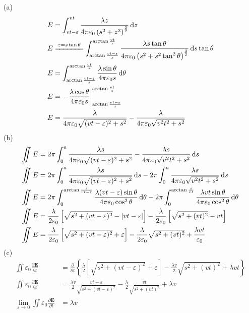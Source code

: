 (a)\begin{align*}
    E&=\int_{vt-\varepsilon}^{vt}\frac{\lambda z}{4\pi\varepsilon_0 \left(s^2+z^2\right)^\frac32}\dif z\\
E&\xlongequal{z=s\tan\theta}\int_{\arctan\frac{vt-\varepsilon}{s}}^{\arctan\frac{vt}{s}}\frac{\lambda s\tan\theta}{4\pi\varepsilon_0 \left(s^2+s^2\tan^2\theta\right)^\frac32}\dif s\tan\theta\\
E&=\int_{\arctan\frac{vt-\varepsilon}{s}}^{\arctan\frac{vt}{s}}\frac{\lambda \sin\theta}{4\pi\varepsilon_0 s}\dif \theta\\
E&=\left.-\frac{\lambda \cos\theta}{4\pi\varepsilon_0 s}\right|_{\arctan\frac{vt-\varepsilon}{s}}^{\arctan\frac{vt}{s}}\\
E&=\frac{\lambda }{4\pi\varepsilon_0 \sqrt{(vt-\varepsilon)^2+s^2}}
-\frac{\lambda }{4\pi\varepsilon_0 \sqrt{v^2t^2+s^2}}\\
\end{align*}
(b)\begin{align*}
    \iint E&=2\pi\int_{0}^{a}\frac{\lambda s}{4\pi\varepsilon_0 \sqrt{(vt-\varepsilon)^2+s^2}}
-\frac{\lambda s}{4\pi\varepsilon_0 \sqrt{v^2t^2+s^2}}\dif s\\
\iint E&=2\pi\int_{0}^{a}\frac{\lambda s}{4\pi\varepsilon_0 \sqrt{(vt-\varepsilon)^2+s^2}}\dif s
-2\pi\int_{0}^{a}\frac{\lambda s}{4\pi\varepsilon_0 \sqrt{v^2t^2+s^2}}\dif s\\
\iint E&=2\pi\int_{0}^{\arctan\frac{s}{vt-\varepsilon}}\frac{\lambda (vt-\varepsilon)\sin\theta}{4\pi\varepsilon_0 \cos^2\theta}\dif \theta
-2\pi\int_{0}^{\arctan\frac{s}{vt}}\frac{\lambda vt\sin\theta}{4\pi\varepsilon_0 \cos^2\theta}\dif \theta\\
\iint E&=\frac{\lambda }{2\varepsilon_0 }\left[\sqrt{s^2+(vt-\varepsilon)^2}-\left|vt-\varepsilon\right|\right]
-\frac{\lambda }{2\varepsilon_0 }\left[\sqrt{s^2+(vt)^2}-vt\right]\\
\iint E&=\frac{\lambda }{2\varepsilon_0 }\left[\sqrt{s^2+(vt-\varepsilon)^2}+\varepsilon\right]
-\frac{\lambda }{2\varepsilon_0 }\sqrt{s^2+(vt)^2}+\frac{\lambda vt}{\varepsilon_0 }
\end{align*}
(c)
\begin{align*}
    \iint \varepsilon_0\frac{\partial \boldsymbol{E}}{\partial t}&=\frac{\partial}{\partial t}\left\{\frac{\lambda }{2 }\left[\sqrt{s^2+(vt-\varepsilon)^2}+\varepsilon\right]
-\frac{\lambda v}{2}\sqrt{s^2+(vt)^2}+\lambda vt\right\}\\
\iint \varepsilon_0\frac{\partial \boldsymbol{E}}{\partial t}&=\frac{\lambda v}{2 }\frac{vt-\varepsilon}{\sqrt{s^2+(vt-\varepsilon)^2}}
-\frac{\lambda }{2}\frac{vt}{\sqrt{s^2+(vt)^2}}+\lambda v\\
\lim_{\varepsilon\to 0}\iint \varepsilon_0\frac{\partial \boldsymbol{E}}{\partial t}&=\lambda v
\end{align*}
